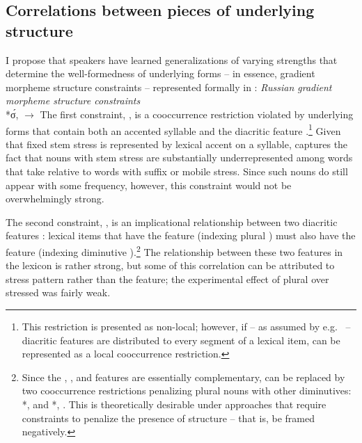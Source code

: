 \documentclass[output=paper,colorlinks,citecolor=brown
]{langscibook}
\begin{document}
\subsection{Correlations between pieces of underlying structure}\label{sec:coranal}
I propose that speakers have learned generalizations of varying strengths that determine the well-formedness of underlying forms -- in essence, gradient morpheme structure constraints \citep[see][]{Booij2011} -- represented formally in :
\ea\label{ex:consts} \emph{Russian gradient morpheme structure constraints}\\
    \ea\label{ex:constsyll} *σ́, 
    \ex\label{ex:constpd}  $\rightarrow$ 
    \z
\z
The first constraint, , is a cooccurrence restriction violated by underlying forms that contain both an accented syllable and the diacritic feature .\footnote{This restriction is presented as non-local; however, if -- as assumed by e.g.\ \citet[][374]{Chomsky.Halle1968} -- diacritic features are distributed to every segment of a lexical item,  can be represented as a local cooccurrence restriction.} Given that fixed stem stress is represented by lexical accent on a syllable,  captures the fact that nouns with stem stress are substantially underrepresented among words that take \ok{} relative to words with suffix or mobile stress. Since such nouns do still appear with some frequency, however, this constraint would not be overwhelmingly strong. %

The second constraint, , is an implicational relationship between two diacritic features \citep[cf.][]{Halle.Marantz2008}: lexical items that have the  feature (indexing plural \pla) must also have the  feature (indexing diminutive \ok).\footnote{Since the , , and  features are essentially complementary,  can be replaced by two cooccurrence restrictions penalizing plural \pla{} nouns with other diminutives: *,  and *, . This is theoretically desirable under approaches \citep[e.g.][]{Hayes.Wilson2008} that require constraints to penalize the presence of structure -- that is, be framed negatively.} %
The relationship between these two features in the lexicon is rather strong, but some of this correlation can be attributed to stress pattern rather than the  feature; the experimental effect of plural \pla{} over stressed \plsi{} was fairly weak.
\end{document}
